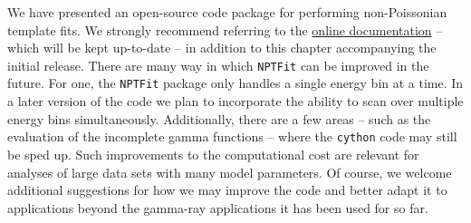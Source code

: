 We have presented an open-source code package for performing non-Poissonian template fits.   We strongly recommend referring to the \href{http://nptfit.readthedocs.io}{online documentation} -- which will be kept up-to-date -- in addition to this chapter accompanying the initial release.  There are many way in which \texttt{NPTFit} can be improved in the future.  For one, the  \texttt{NPTFit} package only handles a single energy bin at a time.  In a later version of the code we plan to incorporate the ability to scan over multiple energy bins simultaneously.  Additionally, there are a few areas -- such as the evaluation of the incomplete gamma functions -- where the \texttt{cython} code may still be sped up.  Such improvements to the computational cost are relevant for analyses of large data sets with many model parameters.  Of course, we welcome additional suggestions for how we may improve the code and better adapt it to applications beyond the gamma-ray applications it has been used for so far. 

\sectionline

